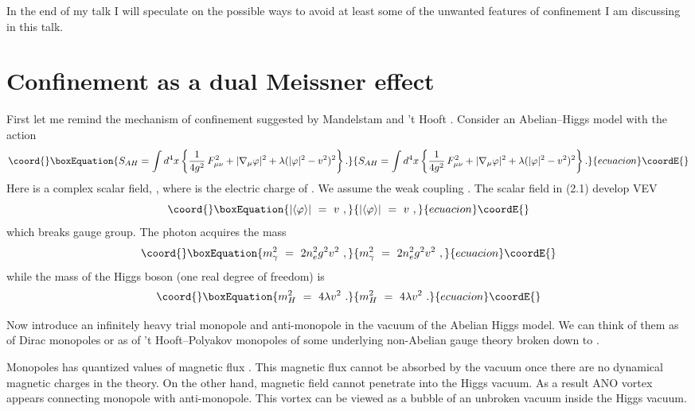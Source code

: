 \documentclass[a4paper,12pt]{article}
\begin{document}
In the end of my talk I will  speculate on the possible ways to
avoid at least some of the unwanted features of
\coordHE{} confinement I am discussing in this talk.

\section{Confinement as a dual Meissner effect}
\setcounter{equation}{0}

First let me remind  the mechanism of confinement suggested by
Mandelstam and 't Hooft \cite{MH}. Consider an Abelian--Higgs
model with the action
\begin{equation}\coord{}\boxEquation{
S_{AH}=\int d^4x\left\{\frac1{4g^2}\,F^2_{\mu\nu}+|\nabla_\mu
\varphi|^2+\lambda(|\varphi|^2-v^2)^2\right\}.
}{
S_{AH}=\int d^4x\left\{\frac1{4g^2}\,F^2_{\mu\nu}+|\nabla_\mu
\varphi|^2+\lambda(|\varphi|^2-v^2)^2\right\}.
}{ecuacion}\coordE{}\end{equation}
Here \myHighlight{$\varphi$}\coordHE{} is a complex scalar field,
\coordHE{}, where \coordHE{} is the electric
charge of \myHighlight{$\varphi$}\coordHE{}. We assume the weak coupling \coordHE{}. The
scalar field in (2.1) develop VEV
\begin{equation}\coord{}\boxEquation{
|\langle\varphi\rangle |\ =\ v\ ,
}{
|\langle\varphi\rangle |\ =\ v\ ,
}{ecuacion}\coordE{}\end{equation}
which breaks \coordHE{} gauge group. The photon acquires the mass
\begin{equation}\coord{}\boxEquation{
m^2_\gamma\ =\ 2n^2_eg^2v^2\ ,
}{
m^2_\gamma\ =\ 2n^2_eg^2v^2\ ,
}{ecuacion}\coordE{}\end{equation}
while the mass of the Higgs boson (one real degree of freedom)
is
\begin{equation}\coord{}\boxEquation{
m^2_H\ =\ 4\lambda v^2\ .
}{
m^2_H\ =\ 4\lambda v^2\ .
}{ecuacion}\coordE{}\end{equation}

Now introduce an infinitely heavy trial monopole and
anti-monopole in the vacuum of the Abelian Higgs model. We can
think of them as of Dirac monopoles or as of 't Hooft--Polyakov
monopoles of some underlying non-Abelian gauge theory broken
down to \coordHE{}.

Monopoles has quantized values of magnetic flux \coordHE{}.
This magnetic flux cannot  be absorbed by the vacuum once there
are no dynamical magnetic charges in the theory.
 On the other hand, magnetic field cannot penetrate into the Higgs
vacuum. As a result ANO vortex appears \cite{ANO} connecting
monopole with anti-monopole. This vortex can be viewed as a 
bubble of an unbroken vacuum inside the Higgs vacuum.
\end{document}
